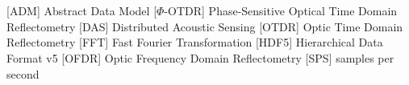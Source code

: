 \cleardoublepage
\chapter*{\listofabbrevname}
{}

\begin{acronym}[KolikMista]
            [ADM]
            {Abstract Data Model}
            [$\Phi$-OTDR]
            {Phase-Sensitive Optical Time Domain Reflectometry}
            [DAS]
            {Distributed Acoustic Sensing}
            [OTDR]
            {Optic Time Domain Reflectometry}
            [FFT]
            {Fast Fourier Transformation}
            [HDF5]
            {Hierarchical Data Format v5}
            [OFDR]
            {Optic Frequency Domain Reflectometry}
            [SPS]
            {samples per second}



\end{acronym}

